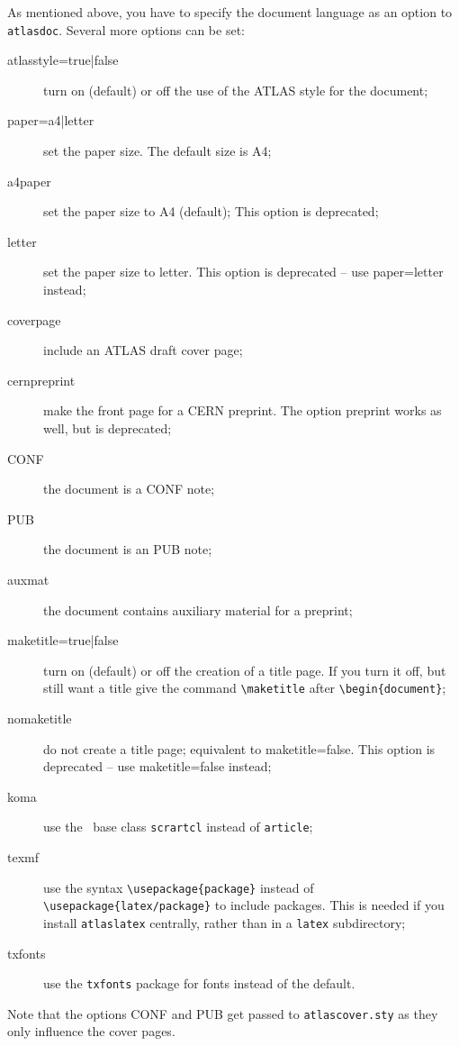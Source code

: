 \documentclass[UKenglish]{latex/atlasdoc}
\newcommand{\File}[1]{\texttt{#1}\xspace}
\newcommand{\Macro}[1]{\texttt{\textbackslash #1}\xspace}
\newcommand{\Option}[1]{\textsf{#1}\xspace}
\newcommand{\Package}[1]{\texttt{#1}\xspace}
\begin{document}
As mentioned above, you have to specify the document language as an option to \Package{atlasdoc}.
Several more options can be set:
\begin{description}
\item[atlasstyle=true|false] turn on (default) or off the use of the ATLAS style for the document;
\item[paper=a4|letter] set the paper size. The default size is A4;
\item[a4paper] set the paper size to A4 (default);
  This option is deprecated;
\item[letter] set the paper size to letter.
  This option is deprecated -- use \Option{paper=letter} instead;
\item[coverpage] include an ATLAS draft cover page;
\item[cernpreprint] make the front page for a CERN preprint.
  The option \Option{preprint} works as well, but is deprecated;
\item[CONF] the document is a CONF note;
\item[PUB] the document is an PUB note;
\item[auxmat] the document contains auxiliary material for a preprint;
\item[maketitle=true|false] turn on (default) or off the creation of a title page. If you turn it off,
  but still want a title give the command \Macro{maketitle} after
  \verb|\begin{document}|;
\item[nomaketitle] do not create a title page; equivalent to \Option{maketitle=false}.
  This option is deprecated -- use \Option{maketitle=false} instead;
\item[koma] use the \KOMAScript\ base class \Package{scrartcl} instead of \Package{article};
\item[texmf] use the syntax \Macro{usepackage\{package\}}
  instead of \Macro{usepackage\{latex/package\}} to include packages.
  This is needed if you install \Package{atlaslatex} centrally,
  rather than in a \File{latex} subdirectory;
\item[txfonts] use the \Package{txfonts} package for fonts instead of the default.
\end{description}
Note that the options \Option{CONF} and \Option{PUB} get passed to \Package{atlascover.sty}
as they only influence the cover pages.


\end{document}
